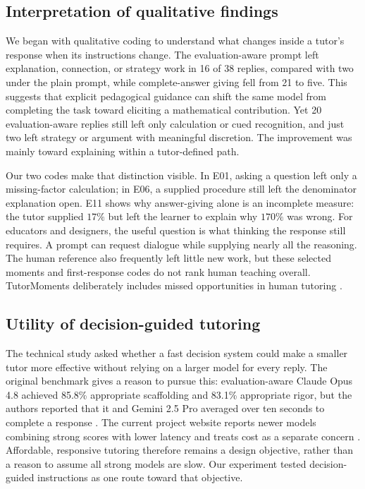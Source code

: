 \subsection{Interpretation of qualitative findings}
We began with qualitative coding to understand what changes inside a tutor's response when its instructions change. The evaluation-aware prompt left explanation, connection, or strategy work in 16 of 38 replies, compared with two under the plain prompt, while complete-answer giving fell from 21 to five. This suggests that explicit pedagogical guidance can shift the same model from completing the task toward eliciting a mathematical contribution. Yet 20 evaluation-aware replies still left only calculation or cued recognition, and just two left strategy or argument with meaningful discretion. The improvement was mainly toward explaining within a tutor-defined path.

Our two codes make that distinction visible. In E01, asking a question left only a missing-factor calculation; in E06, a supplied procedure still left the denominator explanation open. E11 shows why answer-giving alone is an incomplete measure: the tutor supplied $17\%$ but left the learner to explain why $170\%$ was wrong. For educators and designers, the useful question is what thinking the response still requires. A prompt can request dialogue while supplying nearly all the reasoning. The human reference also frequently left little new work, but these selected moments and first-response codes do not rank human teaching overall. TutorMoments deliberately includes missed opportunities in human tutoring \citep{zhang2026tutormoments}.

\subsection{Utility of decision-guided tutoring}
The technical study asked whether a fast decision system could make a smaller tutor more effective without relying on a larger model for every reply. The original benchmark gives a reason to pursue this: evaluation-aware Claude Opus 4.8 achieved 85.8\% appropriate scaffolding and 83.1\% appropriate rigor, but the authors reported that it and Gemini 2.5 Pro averaged over ten seconds to complete a response \citep{zhang2026tutormoments}. The current project website reports newer models combining strong scores with lower latency and treats cost as a separate concern \citep{ai22026tutormomentswebsite}. Affordable, responsive tutoring therefore remains a design objective, rather than a reason to assume all strong models are slow. Our experiment tested decision-guided instructions as one route toward that objective.

